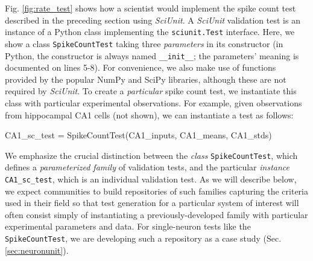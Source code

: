 \documentclass[11pt,letterpaper]{article}
\let\verbx\lstinline
\begin{document}
Fig. \ref{fig:rate_test} shows how a scientist would implement the spike count test described in the preceding section using \textit{SciUnit}. A \textit{SciUnit} validation test is an {instance} of a Python class implementing the \verbx{sciunit.Test} interface. Here, we show a class \verbx{SpikeCountTest} taking three \emph{parameters} in its constructor (in Python, the constructor is always named \verbx{__init__}; the parameters' meaning is documented on lines 5-8). For convenience, we also make use of functions provided by the popular NumPy\cite{numpy_url} and SciPy\cite{scipy_url} libraries, although these are not required by \textit{SciUnit}.  To create a \emph{particular} spike count test, we instantiate this class with particular experimental observations. For example, given observations from hippocampal CA1 cells (not shown), we can instantiate a test as follows:
\begin{python}
  CA1_sc_test = SpikeCountTest(CA1_inputs, CA1_means, CA1_stds)
\end{python}
We emphasize the crucial distinction between the \textit{class} \verbx{SpikeCountTest}, which defines a \emph{parameterized family} of validation tests, and the particular \textit{instance} \verbx{CA1_sc_test}, which is an individual validation test. As we will describe below, we expect communities to build repositories of such families capturing the criteria used in their field so that test generation for a particular system of interest will often consist simply of instantiating a previously-developed family with particular experimental parameters and data. For single-neuron tests like the \verbx{SpikeCountTest}, we are developing such a repository as a case study (Sec. \ref{sec:neuronunit}). 

%
\end{document}
